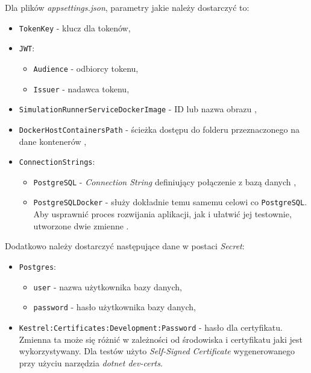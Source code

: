\par Dla plików \emph{appsettings.json}, parametry jakie należy dostarczyć to:
\begin{itemize}
	\item \texttt{TokenKey} - klucz dla tokenów,
	\item \texttt{JWT}:
	\begin{itemize}
		\item \texttt{Audience} - odbiorcy tokenu,
		\item \texttt{Issuer} - nadawca tokenu,
	\end{itemize}
	\item \texttt{SimulationRunnerServiceDockerImage} - ID lub nazwa obrazu \emph{\docker{}},
	\item \texttt{DockerHostContainersPath} - ścieżka dostępu do folderu przeznaczonego na dane kontenerów ,
	\item \texttt{ConnectionStrings}:
	\begin{itemize}
		\item \texttt{PostgreSQL} - \emph{Connection String} definiujący połączenie z bazą danych ,
		\item \texttt{PostgreSQLDocker} - służy dokładnie temu samemu celowi co \texttt{PostgreSQL}. Aby usprawnić proces rozwijania aplikacji, jak i ułatwić jej testownie, utworzone dwie zmienne .
	\end{itemize}
\end{itemize}

\par Dodatkowo należy dostarczyć następujące dane w postaci \emph{\dotnet{} Secret}:
\begin{itemize}
	\item \texttt{Postgres}:
	\begin{itemize}
		\item \texttt{user} - nazwa użytkownika bazy danych,
		\item \texttt{password} - hasło użytkownika bazy danych,
	\end{itemize}
	\item \texttt{Kestrel:Certificates:Development:Password} - hasło dla certyfikatu. Zmienna ta może się różnić w zależności od środowiska i certyfikatu jaki jest wykorzystywany. Dla testów użyto \emph{Self-Signed Certificate} wygenerowanego przy użyciu narzędzia \emph{dotnet dev-certs}.\cite{DOTNET_SELFSIGNED_CERTIFICATE}
\end{itemize}

